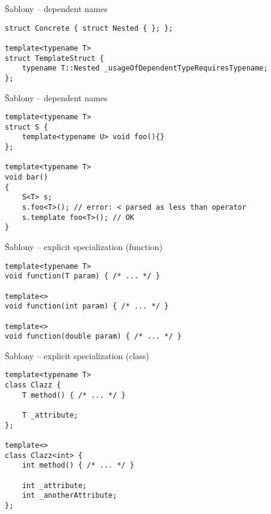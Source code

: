 \begin{frame}[fragile]
\begin{exampleblock}{Šablony -- dependent names} 
\begin{lstlisting}
struct Concrete { struct Nested { }; };

template<typename T>
struct TemplateStruct {
	typename T::Nested _usageOfDependentTypeRequiresTypename;
};
\end{lstlisting}
\end{exampleblock}
\end{frame}



\begin{frame}[fragile]
\begin{exampleblock}{Šablony -- dependent names} 
\begin{lstlisting}
template<typename T>
struct S {
    template<typename U> void foo(){}
};
 
template<typename T>
void bar()
{
    S<T> s;
    s.foo<T>(); // error: < parsed as less than operator
    s.template foo<T>(); // OK
}
\end{lstlisting}
\end{exampleblock}
\end{frame}


\begin{frame}[fragile]
\begin{exampleblock}{Šablony -- explicit specialization (function)} 
\begin{lstlisting}
template<typename T>
void function(T param) { /* ... */ }

template<>
void function(int param) { /* ... */ }

template<>
void function(double param) { /* ... */ }
\end{lstlisting}
\end{exampleblock}
\end{frame}

\begin{frame}[fragile]
\begin{exampleblock}{Šablony -- explicit specialization (class)} 
\begin{lstlisting}
template<typename T>
class Clazz { 
	T method() { /* ... */ }
	
	T _attribute;
};

template<>
class Clazz<int> {
	int method() { /* ... */ }
	
	int _attribute;
	int _anotherAttribute;
};

\end{lstlisting}
\end{exampleblock}
\end{frame}



